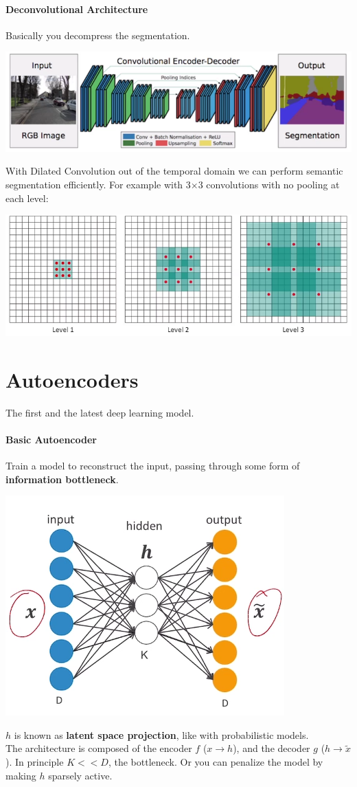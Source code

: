 \documentclass[10pt]{report}
\begin{document}
\paragraph{Deconvolutional Architecture} Basically you decompress the segmentation.
\begin{center}
	\includegraphics[scale=0.5]{73.png}
\end{center}
With Dilated Convolution out of the temporal domain we can perform semantic segmentation efficiently. For example with 3$\times$3 convolutions with no pooling at each level:
\begin{center}
	\includegraphics[scale=0.5]{74.png}
\end{center}
\section{Autoencoders} The first and the latest deep learning model.
\paragraph{Basic Autoencoder} Train a model to reconstruct the input, passing through some form of \textbf{information bottleneck}.\begin{center}
	\includegraphics[scale=0.5]{75.png}
\end{center}
$h$ is known as \textbf{latent space projection}, like with probabilistic models.\\
The architecture is composed of the encoder $f$ ($x\rightarrow h$), and the decoder $g$ ($h\rightarrow\tilde{x}$). In principle $K << D$, the bottleneck. Or you can penalize the model by making $h$ sparsely active.
\end{document}
